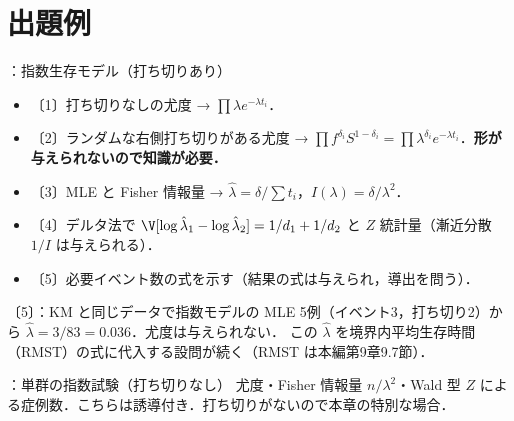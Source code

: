 \section{出題例}\label{sec:m01-shutsudai}
\begin{shutsudai}{：指数生存モデル（打ち切りあり）}
\begin{itemize}
\item 〔1〕打ち切りなしの尤度 → $\prod\lambda e^{-\lambda t_i}$．
\item 〔2〕ランダムな右側打ち切りがある尤度 → $\prod f^{\delta_i}S^{1-\delta_i}=\prod\lambda^{\delta_i}e^{-\lambda t_i}$．\textbf{形が与えられないので知識が必要．}
\item 〔3〕MLE と Fisher 情報量 → $\hat\lambda=\delta/\sum t_i$，$I(\lambda)=\delta/\lambda^2$．
\item 〔4〕デルタ法で $\V[\log\hat\lambda_1-\log\hat\lambda_2]=1/d_1+1/d_2$ と $Z$ 統計量（漸近分散 $1/I$ は与えられる）．
\item 〔5〕必要イベント数の式を示す（結果の式は与えられ，導出を問う）．
\end{itemize}
\end{shutsudai}
\begin{shutsudai}{〔5〕：KM と同じデータで指数モデルの MLE}
5例（イベント3，打ち切り2）から $\hat\lambda=3/83=0.036$．尤度は与えられない．
この $\hat\lambda$ を境界内平均生存時間（RMST）の式に代入する設問が続く（RMST は本編第9章9.7節）．
\end{shutsudai}
\begin{shutsudai}{：単群の指数試験（打ち切りなし）}
尤度・Fisher 情報量 $n/\lambda^2$・Wald 型 $Z$ による症例数．こちらは誘導付き．打ち切りがないので本章の特別な場合．
\end{shutsudai}

